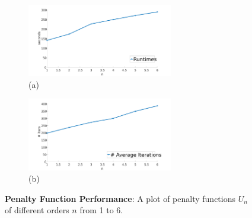 \begin{figure}[t] 
	\centering
	\begin{subfigure}{.49\linewidth}
		\centering \includegraphics[width=2.5in]{images/penalty_runtimes.pdf}
		\caption*{(a)}
		\label{sfig:pen_runtimes}
	\end{subfigure}%
	\begin{subfigure}{.49\linewidth}
		\centering \includegraphics[width=2.5in]{images/penalty_iters.pdf}
		\caption*{(b)}
		\label{sfig:pen_iters}
	\end{subfigure}%
	\caption{\textbf{Penalty Function Performance}: A plot of penalty functions $U_n$ of different orders $n$ from 1 to 6. }
	\label{fig:penalty_comparison}
\end{figure}